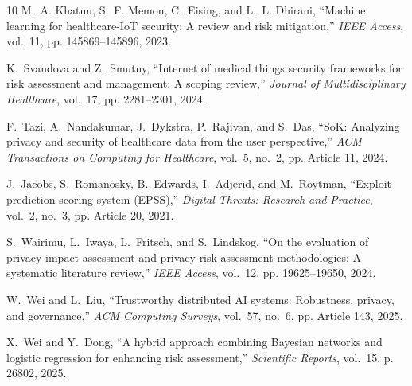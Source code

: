 \documentclass[conference,a4paper]{IEEEtran}
\begin{document}
\begin{thebibliography}{10}
M.~A. Khatun, S.~F. Memon, C.~Eising, and L.~L. Dhirani, ``Machine learning for
  healthcare-{IoT} security: A review and risk mitigation,'' \emph{IEEE
  Access}, vol.~11, pp. 145869--145896, 2023. 

K.~Svandova and Z.~Smutny, ``Internet of medical things security frameworks for
  risk assessment and management: A scoping review,'' \emph{Journal of
  Multidisciplinary Healthcare}, vol.~17, pp. 2281--2301, 2024. 

F.~Tazi, A.~Nandakumar, J.~Dykstra, P.~Rajivan, and S.~Das, ``SoK: Analyzing
  privacy and security of healthcare data from the user perspective,''
  \emph{ACM Transactions on Computing for Healthcare}, vol.~5, no.~2, pp.
  Article 11, 2024. 

J.~Jacobs, S.~Romanosky, B.~Edwards, I.~Adjerid, and M.~Roytman, ``Exploit
  prediction scoring system ({EPSS}),'' \emph{Digital Threats: Research and
  Practice}, vol.~2, no.~3, pp. Article 20, 2021. 

S.~Wairimu, L.~Iwaya, L.~Fritsch, and S.~Lindskog, ``On the evaluation of
  privacy impact assessment and privacy risk assessment methodologies: A
  systematic literature review,'' \emph{IEEE Access}, vol.~12, pp.
  19625--19650, 2024. 

W.~Wei and L.~Liu, ``Trustworthy distributed {AI} systems: Robustness,
  privacy, and governance,'' \emph{ACM Computing Surveys}, vol.~57, no.~6, pp.
  Article 143, 2025. 

X.~Wei and Y.~Dong, ``A hybrid approach combining {Bayesian} networks and
  logistic regression for enhancing risk assessment,'' \emph{Scientific
  Reports}, vol.~15, p. 26802, 2025. 

\end{thebibliography}
\end{document}
